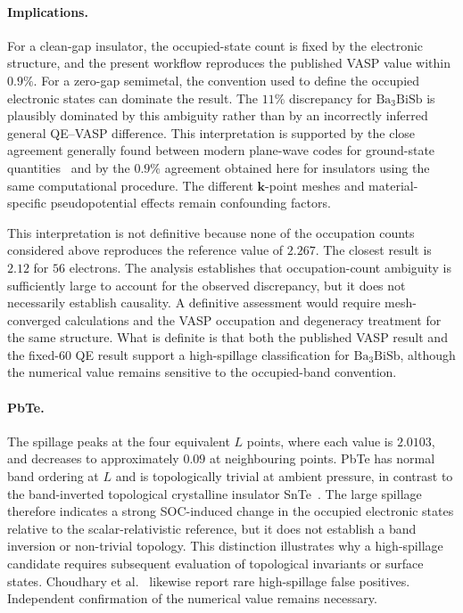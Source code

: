\documentclass[11pt]{article}
\newcommand{\kk}{\mathbf{k}}
\newcommand{\bath}{\mathrm{Ba_3BiSb}}
\begin{document}
\paragraph{Implications.} For a clean-gap insulator, the occupied-state count is fixed by the
electronic structure, and the present workflow reproduces the published VASP value within $0.9\%$.
For a zero-gap semimetal, the convention used to define the occupied electronic states can dominate
the result. The
$11\%$ discrepancy for $\bath$ is plausibly dominated by this ambiguity rather than by an incorrectly
inferred general QE--VASP difference. This interpretation is supported by the close agreement generally found between
modern plane-wave codes for ground-state quantities~\cite{lejaeghere2016} and by the $0.9\%$
agreement obtained here for insulators using the same computational procedure. The different
$\kk$-point meshes and material-specific pseudopotential effects remain confounding factors.

\medskip
\noindent This interpretation is not definitive because none of the occupation counts considered above
reproduces the reference value of $2.267$. The closest result is $2.12$ for $56$ electrons. The
analysis establishes that occupation-count ambiguity is sufficiently large to account for the
observed discrepancy, but it does not necessarily establish causality. A definitive assessment would
require mesh-converged calculations and the VASP occupation and degeneracy treatment for the same
structure. What is definite is that both the published VASP result and
the fixed-$60$ QE result support a high-spillage classification for $\bath$, although the numerical
value remains sensitive to the occupied-band convention.

\paragraph{PbTe.} The spillage peaks at the four equivalent
$L$ points, where each value is $2.0103$, and decreases to approximately $0.09$ at neighbouring
points. PbTe has normal band ordering at $L$ and is topologically trivial at ambient pressure, in
contrast to the band-inverted topological crystalline insulator SnTe~\cite{hsieh2012}. The large
spillage therefore indicates a strong SOC-induced change in the occupied electronic states relative to the
scalar-relativistic reference, but it does not establish a band inversion or non-trivial topology.
This distinction illustrates why a high-spillage candidate requires subsequent evaluation of
topological invariants or surface states. Choudhary et al.~\cite{choudhary2019} likewise report rare
high-spillage false positives. Independent confirmation of the numerical value remains necessary.
\end{document}
